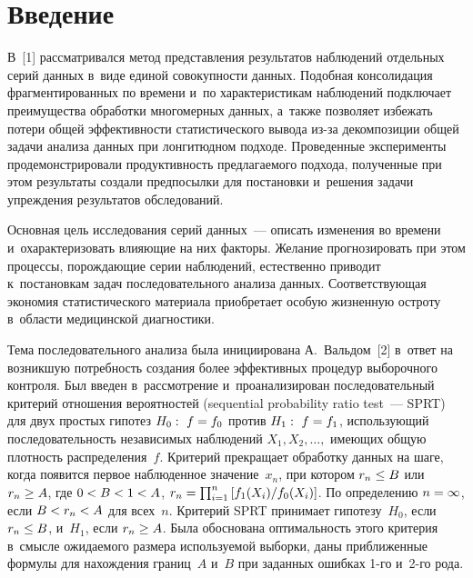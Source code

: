 
\thispagestyle{headings}

\begin{multicols}{2}

\label{st\stat}

 
\section{Введение}

\vspace*{-3pt}

     В~[1] рассматривался метод представления результатов наблюдений 
отдельных серий данных в~виде единой совокупности данных. Подобная 
консолидация фрагментированных по времени и~по характеристикам 
наблюдений подключает преимущества обработки многомерных данных, 
а~также позволяет избежать потери общей эффективности статистического 
вывода из-за декомпозиции общей задачи анализа данных при лонгитюдном 
подходе. Проведенные эксперименты продемонстрировали продуктивность 
предлагаемого подхода, полученные при этом результаты создали предпосылки 
для постановки и~решения задачи упреждения результатов обследований. 
     
     Основная цель исследования серий данных~--- описать изменения во 
времени и~охарактеризовать влияющие на них факторы. Желание 
прогнозировать при этом процессы, порождающие серии наблюдений, 
естественно приводит к~постановкам задач последовательного анализа данных. 
Соответствующая экономия статистического материала приобретает особую 
жизненную остроту в~области медицинской диагностики.
     
     Тема последовательного анализа была ини\-ци\-иро\-ва\-на А.~Вальдом~[2] 
в~ответ на возникшую потребность создания более эффективных процедур 
выборочного контроля. Был введен в~рассмотрение и~проанализирован 
последовательный критерий отношения вероятностей (sequential probability 
ratio test~--- SPRT) для двух простых гипотез $H_0:\ f\hm=f_0$ против $H_1:\ 
f\hm= f_1$, использующий последовательность независимых наблюдений $X_1, 
X_2,\ldots ,$ имеющих общую плот\-ность распределения~$f$. Критерий 
прекращает обработку данных на шаге, когда появится первое наблюденное 
значение~$x_n$, при котором $r_n\hm\leq B$ или $r_n\hm\geq A$, где $0\hm< 
B\hm< 1\hm< A$, $r_n\hm= \prod\nolimits^n_{i=1} \left[ f_1(X_i)/f_0(X_i)\right]$. 
По определению $n\hm=\infty$, если $B\hm< r_n\hm<A$ для всех~$n$. 
Критерий SPRT 
принимает гипотезу~$H_0$, если $r_n\hm\leq B$, и~$H_1$, если $r_n\hm\geq 
A$. Была обоснована оптимальность этого критерия в~смысле ожидаемого 
размера используемой выборки, даны приближенные формулы для нахождения 
границ~$A$ и~$B$ при заданных ошибках 1-го и~2-го рода. 
     

\end{multicols}
